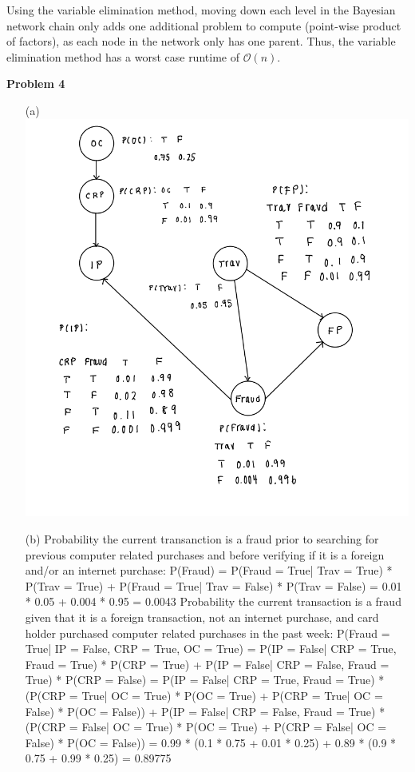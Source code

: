 \documentclass[11pt]{article}
\begin{document}
\begin{enumerate}
        Using the variable elimination method, moving down each level in the Bayesian network
        chain only adds one additional problem to compute (point-wise product of factors), as each node in the
        network only has one parent.
        Thus, the variable elimination method has a worst case
        runtime of $\mathcal{O}(n)$.
    \end{enumerate}

    \begin{center}
        \Large
        \textbf{Problem 4}
    \end{center}
    \normalsize
    \begin{enumerate}
        \item[(a)]
        \includegraphics[width=\linewidth]{images/bayesnetwork} \\
        \item[(b)]
        Probability the current transanction is a fraud prior to searching for previous computer related purchases and before verifying if it is a foreign and/or an internet purchase:
        P(Fraud) = P(Fraud = True| Trav = True) * P(Trav = True) + P(Fraud = True| Trav = False) * P(Trav = False) = 0.01 * 0.05 + 0.004 * 0.95 = 0.0043
        Probability the current transaction is a fraud given that it is a foreign transaction, not an internet purchase, and card holder purchased computer related purchases in the past week:
        P(Fraud = True| IP = False, CRP = True, OC = True) = P(IP = False| CRP = True, Fraud = True) * P(CRP = True) + P(IP = False| CRP = False, Fraud = True) * P(CRP = False) = P(IP = False| CRP = True, Fraud = True) * (P(CRP = True| OC = True) * P(OC = True) + P(CRP = True| OC = False) * P(OC = False)) + P(IP = False| CRP = False, Fraud = True) * (P(CRP = False| OC = True) * P(OC = True) + P(CRP = False| OC = False) * P(OC = False)) = 0.99 * (0.1 * 0.75 + 0.01 * 0.25) + 0.89 * (0.9 * 0.75 + 0.99 * 0.25) = 0.89775
        

\end{enumerate}
\end{document}
